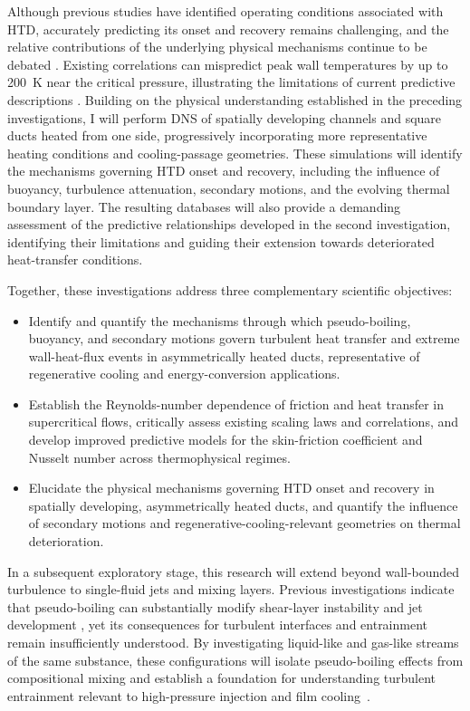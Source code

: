 \documentclass[11pt]{article}
\begin{document}
Although previous studies have identified operating conditions associated with HTD, accurately predicting its onset and recovery remains challenging, and the relative contributions of the underlying physical mechanisms continue to be debated \cite{Nasuti2021,Li2025}.
Existing correlations can mispredict peak wall temperatures by up to 200~K near the critical pressure, illustrating the limitations of current predictive descriptions \cite{Nasuti2021}.
Building on the physical understanding established in the preceding investigations, I will perform DNS of spatially developing channels and square ducts heated from one side, progressively incorporating more representative heating conditions and cooling-passage geometries.
These simulations will identify the mechanisms governing HTD onset and recovery, including the influence of buoyancy, turbulence attenuation, secondary motions, and the evolving thermal boundary layer.
The resulting databases will also provide a demanding assessment of the predictive relationships developed in the second investigation, identifying their limitations and guiding their extension towards deteriorated heat-transfer conditions.

Together, these investigations address three complementary scientific objectives:
\begin{itemize}
	\item[\textbf{O1.}] Identify and quantify the mechanisms through which pseudo-boiling, buoyancy, and secondary motions govern turbulent heat transfer and extreme wall-heat-flux events in asymmetrically heated ducts, representative of regenerative cooling and energy-conversion applications.
	\item[\textbf{O2.}] Establish the Reynolds-number dependence of friction and heat transfer in supercritical flows, critically assess existing scaling laws and correlations, and develop improved predictive models for the skin-friction coefficient and Nusselt number across thermophysical regimes.
	\item[\textbf{O3.}] Elucidate the physical mechanisms governing HTD onset and recovery in spatially developing, asymmetrically heated ducts, and quantify the influence of secondary motions and regenerative-cooling-relevant geometries on thermal deterioration.
\end{itemize}
In a subsequent exploratory stage, this research will extend beyond wall-bounded turbulence to single-fluid jets and mixing layers.
Previous investigations indicate that pseudo-boiling can substantially modify shear-layer instability and jet development \cite{Lapenna2019,SharanBellan2021}, yet its consequences for turbulent interfaces and entrainment remain insufficiently understood.
By investigating liquid-like and gas-like streams of the same substance, these configurations will isolate pseudo-boiling effects from compositional mixing and establish a foundation for understanding turbulent entrainment relevant to high-pressure injection and film cooling~\cite{Mayer2003,Muller2016}.
\end{document}
